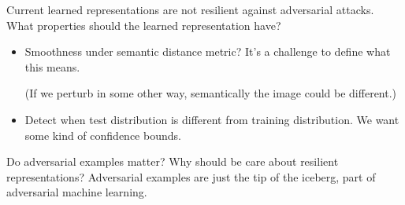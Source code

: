 %
%
%
%
%
%
%
Current learned representations are not resilient against adversarial attacks. What properties should the learned representation have? 
\begin{itemize}
\item
Smoothness under semantic distance metric? 
It's a challenge to define what this means.

(If we perturb in some  other way, semantically the image could be different.)
\item
Detect when test distribution is different from training distribution.
We want some kind of confidence bounds.
\end{itemize}

Do adversarial examples matter? Why should be care about resilient representations? Adversarial examples are just the tip of the iceberg, part of adversarial machine learning.



